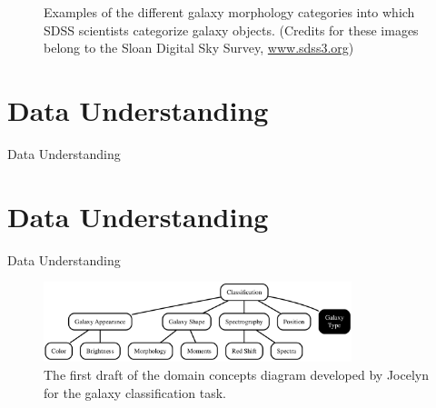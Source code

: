 \documentclass[xcolor={table}]{beamer}
\newcommand{\SectionSlide}[2][]{
	\ifthenelse{\isempty{#1}}
		{\section{#2}\begin{frame} \begin{center}\begin{huge}#2\end{huge}\end{center}\end{frame}}
		{\section[#1]{#2}\begin{frame} \begin{center}\begin{huge}#2\end{huge}\end{center}\end{frame}}
}
\begin{document}
 \begin{frame} 
\begin{figure}
\centering
\caption{Examples of the different galaxy morphology categories into which SDSS scientists categorize galaxy objects. (Credits for these images belong to the Sloan Digital Sky Survey, \url{www.sdss3.org})}
\label{fig:SDSSGalaxyExampleImages}
\end{figure}
\end{frame} 




\SectionSlide{Data Understanding}



 \begin{frame} 
\begin{figure}
\centering
	\includegraphics[width=0.8\textwidth]{./images/Galaxy1.pdf}

\caption{The first draft of the domain concepts diagram developed by Jocelyn for the galaxy classification task.}
\label{fig:galaxyClassDomainConcepts1}
\end{figure}
\end{frame} 
\end{document}
